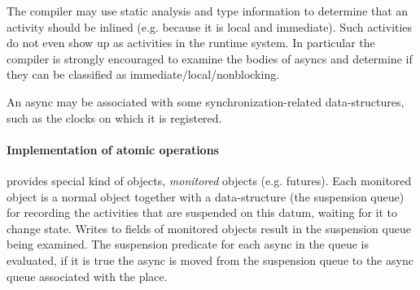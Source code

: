 The compiler may use static analysis and type information to
determine that an activity should be inlined (e.g.{} because it is
local and immediate). Such activities do not even show up as
activities in the runtime system. In particular the compiler is
strongly encouraged to examine the bodies of asyncs and determine if
they can be classified as immediate/local/nonblocking.

An async may be associated with some synchronization-related
data-structures, such as the clocks on which it is registered.

\paragraph{Implementation of atomic operations}
{}\Xtenlib{} provides special kind of objects, {\em monitored} objects
(e.g.{} futures). Each monitored object is a normal \Xten{} object
together with a data-structure (the suspension queue) for recording
the activities that are suspended on this datum, waiting for it to
change state. Writes to fields of monitored objects result in the
suspension queue being examined. The suspension predicate for each
async in the queue is evaluated, if it is true the async is moved from
the suspension queue to the async queue associated with the place.
